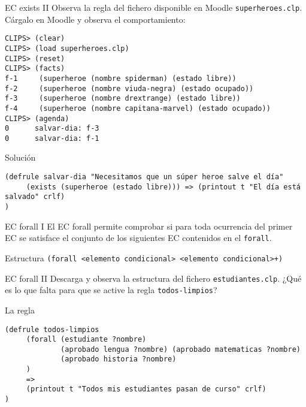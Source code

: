 \documentclass[usenames,dvipsnames,aspectratio=169]{beamer}
\begin{document}
\begin{frame}[fragile]{EC exists II}
	Observa la regla del fichero disponible en Moodle \texttt{superheroes.clp}. Cárgalo en Moodle y observa el comportamiento:
	\begin{minipage}{\textwidth}
		\footnotesize
		\begin{verbatim}
CLIPS> (clear)
CLIPS> (load superheroes.clp)
CLIPS> (reset)
CLIPS> (facts)
f-1     (superheroe (nombre spiderman) (estado libre))
f-2     (superheroe (nombre viuda-negra) (estado ocupado))
f-3     (superheroe (nombre drextrange) (estado libre))
f-4     (superheroe (nombre capitana-marvel) (estado ocupado))
CLIPS> (agenda)
0      salvar-dia: f-3
0      salvar-dia: f-1
		\end{verbatim}
	\end{minipage}
	\begin{exampleblock}{\footnotesize Solución}
		\scriptsize
		\begin{verbatim}
(defrule salvar-dia "Necesitamos que un súper heroe salve el día"
     (exists (superheroe (estado libre))) => (printout t "El día está salvado" crlf)
)
		\end{verbatim}
	\end{exampleblock}
\end{frame}

\begin{frame}{EC forall I}
	El EC forall permite comprobar si para toda ocurrencia del primer EC se satisface el conjunto de los siguientes EC contenidos en el \texttt{forall}.
	\begin{block}{Estructura}
		\texttt{(forall <elemento condicional> <elemento condicional>+)}
	\end{block}
\end{frame}

\begin{frame}[fragile]{EC forall II}
	Descarga y observa la estructura del fichero \texttt{estudiantes.clp}.
	¿Qué es lo que falta para que se active la regla \texttt{todos-limpios}?
	\begin{exampleblock}{La regla}
		\begin{verbatim}
(defrule todos-limpios
     (forall (estudiante ?nombre)
             (aprobado lengua ?nombre) (aprobado matematicas ?nombre)
             (aprobado historia ?nombre)
     )
     =>
     (printout t "Todos mis estudiantes pasan de curso" crlf)
)
		\end{verbatim}
	\end{exampleblock}
\end{frame} 
\end{document}
